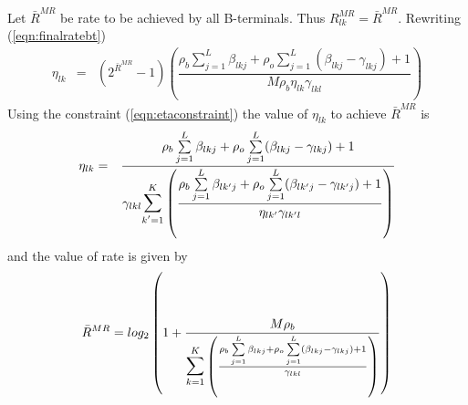 \documentclass[10pt, a4paper, twoside,fleqn]{article}
\begin{document}
Let $\bar{R}^{MR}$ be rate to be achieved by all B-terminals. Thus $R_{lk}^{MR} = \bar{R}^{MR}$. Rewriting (\ref{eqn:finalratebt})
\begin{eqnarray}
    \eta_{lk} &=& (2^{\bar{R}^{MR}} - 1)\left(\dfrac{\rho_b\sum\limits_{j=1}^{L}\beta_{lkj}+\rho_o\sum\limits_{j=1}^{L}(\beta_{lkj} -\gamma_{lkj})+1}{M\rho_b\eta_{lk}\gamma_{lkl}}\right)
\end{eqnarray}
Using the constraint (\ref{eqn:etaconstraint}) the value of $\eta_{lk}$ to achieve $\bar{R}^{MR}$ is
\begin{eqnarray}
    \eta_{lk} &=& \frac{\rho_b\sum\limits_{j=1}^{L}\beta_{lkj}+\rho_o\sum\limits_{j=1}^{L}(\beta_{lkj} -\gamma_{lkj})+1}{\gamma_{lkl}\mathlarger{\mathlarger{\sum}}\limits_{k'=1}^{K}\left(\dfrac{\rho_b\sum\limits_{j=1}^{L}\beta_{lk'j}+\rho_o\sum\limits_{j=1}^{L}(\beta_{lk'j} -\gamma_{lk'j})+1}{\eta_{lk'}\gamma_{lk'l}}\right)}
\end{eqnarray}
and the value of rate is given by
\begin{eqnarray}
    \bar{R}^{MR} =log_2\left(1+\frac{M\rho_b}{\mathlarger{\mathlarger{\sum}}\limits_{k=1}^{K}\left(\frac{\rho_b\sum\limits_{j=1}^{L}\beta_{lkj}+\rho_o\sum\limits_{j=1}^{L}(\beta_{lkj} -\gamma_{lkj})+1}{\gamma_{lkl}}\right)} \right)
\end{eqnarray}
  
\end{document}
